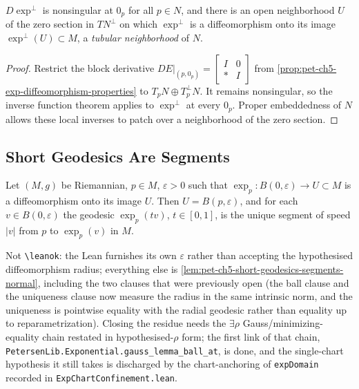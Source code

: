 \begin{corollary}
  \label{cor:pet-ch5-tubular-neighborhood}

  $D\exp^\perp$ is nonsingular at $0_p$ for all $p\in N$, and there is an open
  neighborhood $U$ of the zero section in $TN^\perp$ on which $\exp^\perp$ is a
  diffeomorphism onto its image $\exp^\perp(U)\subset M$, a \emph{tubular
  neighborhood} of $N$.
\end{corollary}
\begin{proof}
  \sketch
  Restrict the block derivative
  $DE|_{(p,0_p)}=\begin{bmatrix}I&0\\ *&I\end{bmatrix}$ from
  \cref{prop:pet-ch5-exp-diffeomorphism-properties} to
  $T_pN\oplus T_p^\perp N$.  It remains nonsingular, so the inverse function
  theorem applies to $\exp^\perp$ at every $0_p$.  Proper embeddedness of $N$
  allows these local inverses to patch over a neighborhood of the zero section.
\end{proof}

\subsection{Short Geodesics Are Segments}

\begin{theorem}
  \label{thm:pet-ch5-short-geodesics-segments}

  Let $(M,g)$ be Riemannian, $p\in M$, $\varepsilon>0$ such that
  $\exp_p:B(0,\varepsilon)\to U\subset M$ is a diffeomorphism onto its image $U$.
  Then $U=B(p,\varepsilon)$, and for each $v\in B(0,\varepsilon)$ the geodesic
  $\exp_p(tv)$, $t\in[0,1]$, is the unique segment of speed $|v|$ from $p$ to
  $\exp_p(v)$ in $M$.

  Not \texttt{\textbackslash leanok}: the Lean furnishes its own $\varepsilon$
  rather than accepting the hypothesised diffeomorphism radius; everything else is
  \cref{lem:pet-ch5-short-geodesics-segments-normal}, including the two clauses
  that were previously open (the ball clause and the uniqueness clause now measure
  the radius in the same intrinsic norm, and the uniqueness is pointwise equality
  with the radial geodesic rather than equality up to reparametrization).  Closing
  the residue needs the $\exists\rho$ Gauss/minimizing-equality chain restated in
  hypothesised-$\rho$ form; the first link of that chain,
  \texttt{PetersenLib.Exponential.gauss\_lemma\_ball\_at}, is done, and the
  single-chart hypothesis it still takes is discharged by the chart-anchoring of
  \texttt{expDomain} recorded in \texttt{ExpChartConfinement.lean}.
\end{theorem}

